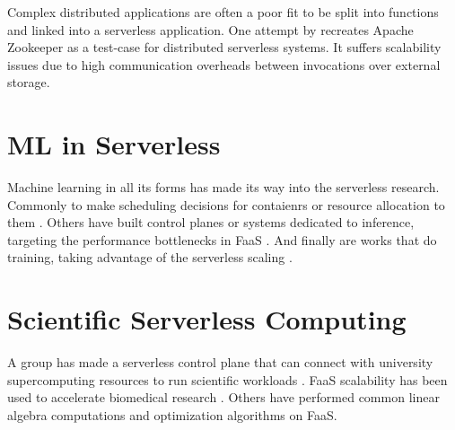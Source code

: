 Complex distributed applications are often a poor fit to be split into functions and linked into a serverless application.
One attempt by \cite{copik2022faaskeeper} recreates Apache Zookeeper as a test-case for distributed serverless systems. 
It suffers scalability issues due to high communication overheads between invocations over external storage.

\section{ML in Serverless}
\label{sec:serverless-ai}

Machine learning in all its forms has made its way into the serverless research.
Commonly to make scheduling decisions for contaienrs \cite{balaji2021fireplace} or resource allocation to them \cite{mvondo2021ofc,eismann2021sizeless}.
Others have built control planes or systems dedicated to inference, targeting the performance bottlenecks in FaaS \cite{yang2022infless, ali2022optimizing}.
And finally are works that do training, taking advantage of the serverless scaling \cite{wang2019distributed, gimeno2022mlless, xu2021lambdadnn}.


\section{Scientific Serverless Computing}

A group has made a serverless control plane that can connect with university supercomputing resources to run scientific workloads \cite{funcx_hpdc_20}.
FaaS scalability has been used to accelerate biomedical research \cite{kumanov2018serverless,hung2019rapid}.
Others have performed common linear algebra computations \cite{werner2018serverless,shankar2020serverless} and optimization algorithms \cite{aytekin2019harnessing} on FaaS.
